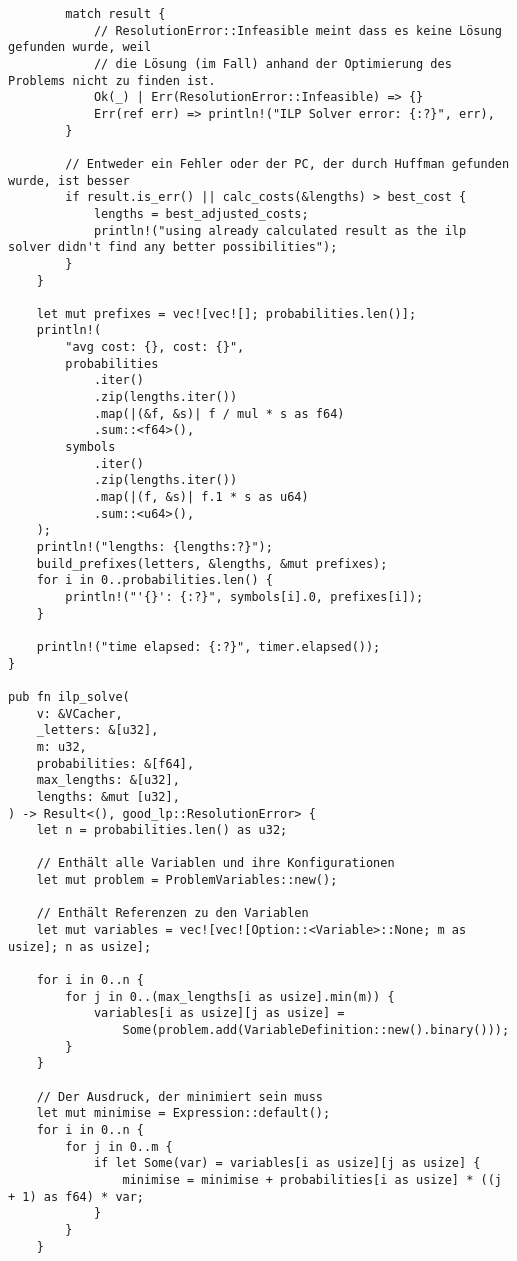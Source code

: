 \begin{lstlisting}
        match result {
            // ResolutionError::Infeasible meint dass es keine Lösung gefunden wurde, weil
            // die Lösung (im Fall) anhand der Optimierung des Problems nicht zu finden ist.
            Ok(_) | Err(ResolutionError::Infeasible) => {}
            Err(ref err) => println!("ILP Solver error: {:?}", err),
        }

        // Entweder ein Fehler oder der PC, der durch Huffman gefunden wurde, ist besser
        if result.is_err() || calc_costs(&lengths) > best_cost {
            lengths = best_adjusted_costs;
            println!("using already calculated result as the ilp solver didn't find any better possibilities");
        }
    }

    let mut prefixes = vec![vec![]; probabilities.len()];
    println!(
        "avg cost: {}, cost: {}",
        probabilities
            .iter()
            .zip(lengths.iter())
            .map(|(&f, &s)| f / mul * s as f64)
            .sum::<f64>(),
        symbols
            .iter()
            .zip(lengths.iter())
            .map(|(f, &s)| f.1 * s as u64)
            .sum::<u64>(),
    );
    println!("lengths: {lengths:?}");
    build_prefixes(letters, &lengths, &mut prefixes);
    for i in 0..probabilities.len() {
        println!("'{}': {:?}", symbols[i].0, prefixes[i]);
    }

    println!("time elapsed: {:?}", timer.elapsed());
}

pub fn ilp_solve(
    v: &VCacher,
    _letters: &[u32],
    m: u32,
    probabilities: &[f64],
    max_lengths: &[u32],
    lengths: &mut [u32],
) -> Result<(), good_lp::ResolutionError> {
    let n = probabilities.len() as u32;

    // Enthält alle Variablen und ihre Konfigurationen
    let mut problem = ProblemVariables::new();
    
    // Enthält Referenzen zu den Variablen
    let mut variables = vec![vec![Option::<Variable>::None; m as usize]; n as usize];

    for i in 0..n {
        for j in 0..(max_lengths[i as usize].min(m)) {
            variables[i as usize][j as usize] =
                Some(problem.add(VariableDefinition::new().binary()));
        }
    }

    // Der Ausdruck, der minimiert sein muss
    let mut minimise = Expression::default();
    for i in 0..n {
        for j in 0..m {
            if let Some(var) = variables[i as usize][j as usize] {
                minimise = minimise + probabilities[i as usize] * ((j + 1) as f64) * var;
            }
        }
    }


\end{lstlisting}
